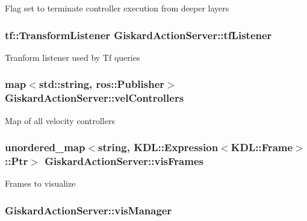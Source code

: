 Flag set to terminate controller execution from deeper layers \hypertarget{classGiskardActionServer_ae7deb327e757759d21614df5adbc42f3}{
\subsubsection[{tf\-Listener}]{\setlength{\rightskip}{0pt plus 5cm}tf\-::\-Transform\-Listener Giskard\-Action\-Server\-::tf\-Listener\hspace{0.3cm}{\ttfamily [private]}}}\label{classGiskardActionServer_ae7deb327e757759d21614df5adbc42f3}
Tranform listener used by Tf queries \hypertarget{classGiskardActionServer_a4ea7edab163168d8c747f7d2e67b2f67}{
\subsubsection[{vel\-Controllers}]{\setlength{\rightskip}{0pt plus 5cm}map$<$std\-::string, ros\-::\-Publisher$>$ Giskard\-Action\-Server\-::vel\-Controllers\hspace{0.3cm}{\ttfamily [protected]}}}\label{classGiskardActionServer_a4ea7edab163168d8c747f7d2e67b2f67}
Map of all velocity controllers \hypertarget{classGiskardActionServer_a018f9bc81967e035deb6cec695893dbc}{
\subsubsection[{vis\-Frames}]{\setlength{\rightskip}{0pt plus 5cm}unordered\-\_\-map$<$string, K\-D\-L\-::\-Expression$<$K\-D\-L\-::\-Frame$>$\-::Ptr$>$ Giskard\-Action\-Server\-::vis\-Frames\hspace{0.3cm}{\ttfamily [private]}}}\label{classGiskardActionServer_a018f9bc81967e035deb6cec695893dbc}
Frames to visualize \hypertarget{classGiskardActionServer_a4aca89815a5d0cb84475773401613365}{
\subsubsection[{vis\-Manager}]{ Giskard\-Action\-Server\-::vis\-Manager\hspace{0.3cm}{\ttfamily [private]}}}\label{classGiskardActionServer_a4aca89815a5d0cb84475773401613365}
